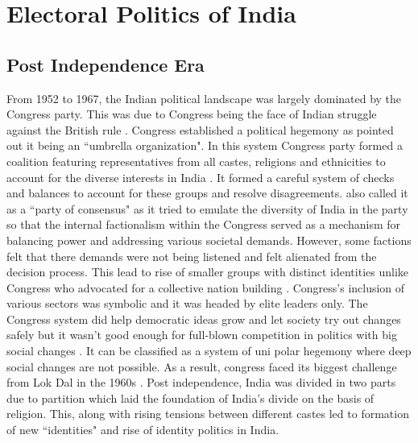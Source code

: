 \section{Electoral Politics of India}
\subsection{Post Independence Era}
 From 1952 to 1967, the Indian political landscape was largely dominated by the Congress party. This was due to Congress being the face of Indian struggle against the British rule \citep{shastri1991nehru}. Congress established a political hegemony as \cite{kothari1967india} pointed out it being an ``umbrella organization". In this system Congress party formed a  coalition featuring representatives from all castes, religions and ethnicities to account for the diverse interests in India \citep{anand2015downfall}. It formed a careful system of checks and balances to account for these groups and resolve disagreements. \cite{kothari1967india} also called it as a ``party of consensus" as it tried to emulate the diversity of India in the party so that the internal factionalism within the Congress served as a mechanism for balancing power and addressing various societal demands. However, some factions felt that there demands were not being listened and felt alienated from the decision process. This lead to rise of smaller groups with distinct identities unlike Congress who advocated for a collective nation building \citep{shastri2003continuity}.  Congress’s inclusion of various sectors was symbolic and it
was headed by elite leaders only. The Congress system did help democratic ideas grow and let society try out changes safely but it wasn’t good enough for full-blown competition
in politics with big social changes \citep{shastri2009electoral}. It
can be classified as a system of uni polar hegemony where deep social changes are not possible. As a result, congress faced its biggest challenge from Lok Dal in the 1960s \citep{desouza2006india}. Post independence, India was divided in two parts due to partition which laid the foundation of India's divide on the basis of religion. This, along with rising tensions between different castes led to formation of new ``identities" and rise of identity politics in India. 
